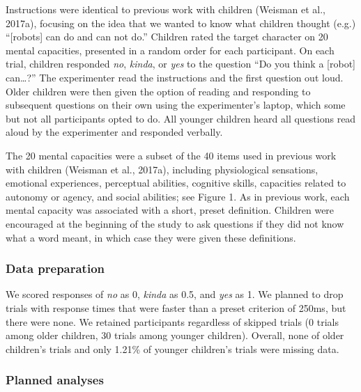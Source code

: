 \documentclass[10pt, letterpaper]{article}
\begin{document}
Instructions were identical to previous work with children (Weisman et
al., 2017a), focusing on the idea that we wanted to know what children
thought (e.g.) ``{[}robots{]} can do and can not do.'' Children rated
the target character on 20 mental capacities, presented in a random
order for each participant. On each trial, children responded \emph{no},
\emph{kinda}, or \emph{yes} to the question ``Do you think a {[}robot{]}
can\ldots{}?'' The experimenter read the instructions and the first
question out loud. Older children were then given the option of reading
and responding to subsequent questions on their own using the
experimenter's laptop, which some but not all participants opted to do.
All younger children heard all questions read aloud by the experimenter
and responded verbally.

The 20 mental capacities were a subset of the 40 items used in previous
work with children (Weisman et al., 2017a), including physiological
sensations, emotional experiences, perceptual abilities, cognitive
skills, capacities related to autonomy or agency, and social abilities;
see Figure 1. As in previous work, each mental capacity was associated
with a short, preset definition. Children were encouraged at the
beginning of the study to ask questions if they did not know what a word
meant, in which case they were given these definitions.

\subsubsection{Data preparation}\label{data-preparation}

We scored responses of \emph{no} as 0, \emph{kinda} as 0.5, and
\emph{yes} as 1. We planned to drop trials with response times that were
faster than a preset criterion of 250ms, but there were none. We
retained participants regardless of skipped trials (0 trials among older
children, 30 trials among younger children). Overall, none of older
children's trials and only 1.21\% of younger children's trials were
missing data.

\subsubsection{Planned analyses}\label{planned-analyses}
\end{document}
